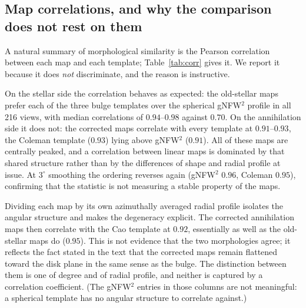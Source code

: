 
\subsection{Map correlations, and why the comparison does not rest on them}

A natural summary of morphological similarity is the Pearson correlation
between each map and each template; Table~\ref{tab:corr} gives it. We report
it because it does \emph{not} discriminate, and the reason is instructive.

On the stellar side the correlation behaves as expected: the old-stellar maps
prefer each of the three bulge templates over the spherical gNFW$^{2}$
profile in all 216 views, with median correlations of $0.94$--$0.98$ against
$0.70$. On the annihilation side it does not: the corrected maps correlate
with every template at $0.91$--$0.93$, the Coleman template ($0.93$) lying
above gNFW$^{2}$ ($0.91$). All of these maps are centrally peaked,
and a correlation between linear maps is dominated by that shared structure
rather than by the differences of shape and radial profile at issue. At
$3^{\circ}$ smoothing the ordering reverses again (gNFW$^{2}$ $0.96$,
Coleman $0.95$), confirming that the statistic is not measuring a stable
property of the maps.

Dividing each map by its own azimuthally averaged radial profile isolates the
angular structure and makes the degeneracy explicit. The corrected
annihilation maps then correlate with the Cao template at $0.92$, essentially
as well as the old-stellar maps do ($0.95$). This is not evidence that the two
morphologies agree; it reflects the fact stated in the text that the corrected
maps remain flattened toward the disk plane in the same sense as the bulge.
The distinction between them is one of degree and of radial profile, and
neither is captured by a correlation coefficient. (The gNFW$^{2}$ entries in
those columns are not meaningful: a spherical template has no angular
structure to correlate against.)

